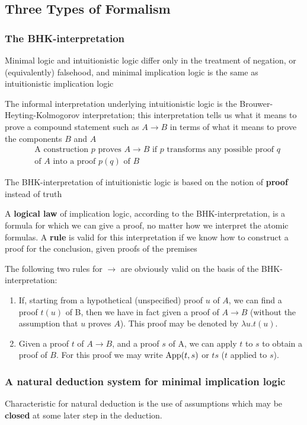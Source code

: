 \documentclass[11pt]{article}
\begin{document}
\subsection{Three Types of Formalism}
\label{sec:org63a8494}
\subsubsection{The BHK-interpretation}
\label{sec:org37c2a72}
Minimal logic and intuitionistic logic differ only in the treatment of
negation, or (equivalently) falsehood, and minimal implication logic is the
same  
as intuitionistic implication logic

The informal interpretation underlying intuitionistic logic is the
Brouwer-Heyting-Kolmogorov interpretation; this interpretation tells us what
it means to 
prove a compound statement such as \(A\to B\) in terms of what it means to
prove the components \(B\) and \(A\) 
\begin{align*}
&\text{A construction }p\text{ proves }A\to B\text{ if }p\text{ transforms any
possible proof }q\\
&\text{of }A\text{ into a proof }p(q)\text{ of }B
\end{align*}

The BHK-interpretation of intuitionistic logic is based on the notion of \textbf{proof}
instead of truth

A \textbf{logical law} of implication logic, according to the BHK-interpretation, is a
formula for which we can give a proof, no matter how we interpret the atomic
formulas. A \textbf{rule} is valid for this interpretation if we know how to construct
a proof for the conclusion, given proofs of the premises

The following two rules for \(\to\) are obviously valid on the basis of the
BHK-interpretation: 
\begin{enumerate}
\item If, starting from a hypothetical (unspecified) proof \(u\) of \(A\), we can find
a proof \(t(u)\) of B, then we have in fact given a proof of \(A\to B\) (without
the assumption that \(u\) proves \(A\)). This proof may be denoted by
\(\lambda u.t(u)\).
\item Given a proof \(t\) of \(A\to B\), and a proof \(s\) of A, we can apply \(t\) to \(s\)
to obtain a proof of \(B\). For this proof we may write \(\text{App}(t,s)\) or \(ts\) (\(t\)
applied to \(s\)).
\end{enumerate}
\subsubsection{A natural deduction system for minimal implication logic}
\label{sec:org99b1163}
Characteristic for natural deduction is the use of assumptions which may
be \textbf{closed} at some later step in the deduction.
\end{document}
